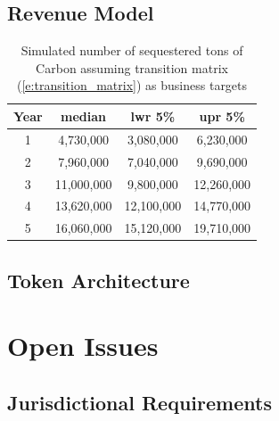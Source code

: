 \documentclass{article}
\begin{document}
\subsection{Revenue Model}

\begin{table}[h]
\centering
\begin{tabular}{ |c|c|c|c| } 
\hline
 Year & median & lwr 5\% & upr 5\% \\
\hline
1 & 4,730,000 & 3,080,000 & 6,230,000 \\
2 & 7,960,000 & 7,040,000 & 9,690,000 \\
3 & 11,000,000 & 9,800,000 & 12,260,000 \\
4 & 13,620,000 & 12,100,000 & 14,770,000  \\
5 & 16,060,000 & 15,120,000 & 19,710,000 \\
\hline
\end{tabular}
\caption{Simulated number of sequestered tons of Carbon assuming transition matrix (\ref{e:transition_matrix}) as business targets}
\label{table:pow_vs_pos}
\end{table}

\subsection{Token Architecture}

\section{Open Issues}

\subsection{Jurisdictional Requirements}
\end{document}
